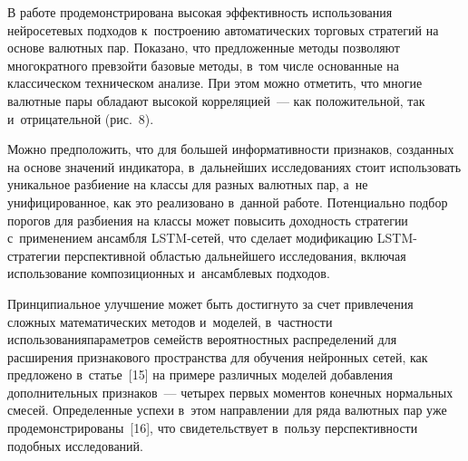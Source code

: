 {\begin{multicols}{2}
 \vspace*{-2pt}

  В работе продемонстрирована высокая эффективность использования нейросетевых 
подходов к~построению автоматических торговых стратегий на основе валютных пар. 
Показано, что предложенные методы позволяют многократного превзойти базовые методы, 
в~том числе основанные на классическом техническом анализе.
  При этом можно отметить, что многие валютные пары обладают высокой корреляцией~--- 
как положительной, так и~отрицательной (рис.~8). 
  
  
  
  Можно предположить, что для большей информативности признаков, созданных на 
основе значений индикатора, в~дальнейших исследованиях стоит использовать уникальное 
разбиение на классы для разных валютных пар, а~не унифицированное, как это реализовано 
в~данной работе. Потенциально подбор порогов для разбиения на классы может повысить 
доходность стратегии с~применением ан\-самб\-ля LSTM-се\-тей, что сделает модификацию 
LSTM-стра\-те\-гии перспективной об\-ластью дальнейшего исследования, включая 
использование композиционных и~ан\-самб\-ле\-вых подходов. 
  
  Принципиальное улучшение может быть достигнуто за счет привлечения сложных 
математических методов и~моделей, в~частности использования\linebreak  параметров семейств 
вероятностных распределений для расширения признакового пространства для обучения 
нейронных сетей, как предложено в~\mbox{статье}~[15] на примере различных моделей добавления 
дополнительных признаков~--- четырех первых моментов конечных нормальных смесей. 
Определенные успехи в~этом направлении для ряда валютных пар уже 
продемонстрированы~[16], что свидетельствует в~пользу перспективности подобных 
исследований.

\end{multicols}

\begin{figure*} %
   \vspace*{1pt}
  \begin{center}  
    \mbox{%
\epsfxsize=130.012mm
}

\end{center}
\vspace*{-6pt}
   \end{figure*}
   
   \vspace*{-9pt}
   
}
